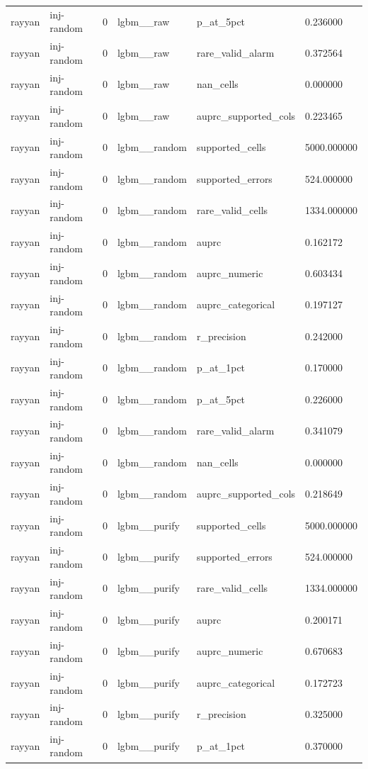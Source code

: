 \begin{tabular}{llllll}
rayyan & inj-random & 0 & lgbm\_\_raw & p\_at\_5pct & 0.236000 \\
rayyan & inj-random & 0 & lgbm\_\_raw & rare\_valid\_alarm & 0.372564 \\
rayyan & inj-random & 0 & lgbm\_\_raw & nan\_cells & 0.000000 \\
rayyan & inj-random & 0 & lgbm\_\_raw & auprc\_supported\_cols & 0.223465 \\
rayyan & inj-random & 0 & lgbm\_\_random & supported\_cells & 5000.000000 \\
rayyan & inj-random & 0 & lgbm\_\_random & supported\_errors & 524.000000 \\
rayyan & inj-random & 0 & lgbm\_\_random & rare\_valid\_cells & 1334.000000 \\
rayyan & inj-random & 0 & lgbm\_\_random & auprc & 0.162172 \\
rayyan & inj-random & 0 & lgbm\_\_random & auprc\_numeric & 0.603434 \\
rayyan & inj-random & 0 & lgbm\_\_random & auprc\_categorical & 0.197127 \\
rayyan & inj-random & 0 & lgbm\_\_random & r\_precision & 0.242000 \\
rayyan & inj-random & 0 & lgbm\_\_random & p\_at\_1pct & 0.170000 \\
rayyan & inj-random & 0 & lgbm\_\_random & p\_at\_5pct & 0.226000 \\
rayyan & inj-random & 0 & lgbm\_\_random & rare\_valid\_alarm & 0.341079 \\
rayyan & inj-random & 0 & lgbm\_\_random & nan\_cells & 0.000000 \\
rayyan & inj-random & 0 & lgbm\_\_random & auprc\_supported\_cols & 0.218649 \\
rayyan & inj-random & 0 & lgbm\_\_purify & supported\_cells & 5000.000000 \\
rayyan & inj-random & 0 & lgbm\_\_purify & supported\_errors & 524.000000 \\
rayyan & inj-random & 0 & lgbm\_\_purify & rare\_valid\_cells & 1334.000000 \\
rayyan & inj-random & 0 & lgbm\_\_purify & auprc & 0.200171 \\
rayyan & inj-random & 0 & lgbm\_\_purify & auprc\_numeric & 0.670683 \\
rayyan & inj-random & 0 & lgbm\_\_purify & auprc\_categorical & 0.172723 \\
rayyan & inj-random & 0 & lgbm\_\_purify & r\_precision & 0.325000 \\
rayyan & inj-random & 0 & lgbm\_\_purify & p\_at\_1pct & 0.370000 \\

\end{tabular}
